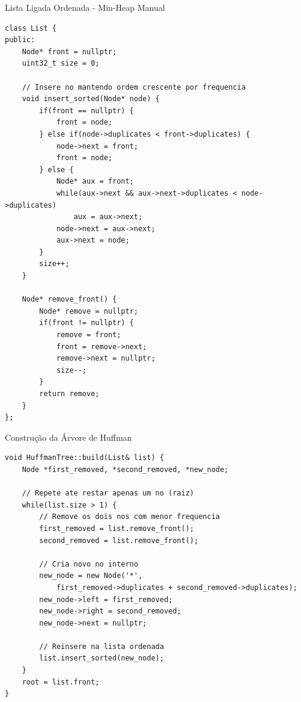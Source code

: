 \documentclass{beamer}
\begin{document}
\begin{frame}[fragile]{Lista Ligada Ordenada - Min-Heap Manual}
    \begin{lstlisting}[style=CStyle, caption=Implementação de lista ordenada para construção da árvore]
class List {
public:
    Node* front = nullptr;
    uint32_t size = 0;
    
    // Insere no mantendo ordem crescente por frequencia
    void insert_sorted(Node* node) {
        if(front == nullptr) {
            front = node;
        } else if(node->duplicates < front->duplicates) {
            node->next = front;
            front = node;
        } else {
            Node* aux = front;
            while(aux->next && aux->next->duplicates < node->duplicates)
                aux = aux->next;
            node->next = aux->next;
            aux->next = node;
        }
        size++;
    }
    
    Node* remove_front() {
        Node* remove = nullptr;
        if(front != nullptr) {
            remove = front;
            front = remove->next;
            remove->next = nullptr;
            size--;
        }
        return remove;
    }
};
    \end{lstlisting}
\end{frame}

\begin{frame}[fragile]{Construção da Árvore de Huffman}
    \begin{lstlisting}[style=CStyle, caption=Algoritmo de construção da árvore]
void HuffmanTree::build(List& list) {
    Node *first_removed, *second_removed, *new_node;
    
    // Repete ate restar apenas um no (raiz)
    while(list.size > 1) {
        // Remove os dois nos com menor frequencia
        first_removed = list.remove_front();
        second_removed = list.remove_front();
        
        // Cria novo no interno
        new_node = new Node('*', 
            first_removed->duplicates + second_removed->duplicates);
        new_node->left = first_removed;
        new_node->right = second_removed;
        new_node->next = nullptr;
        
        // Reinsere na lista ordenada
        list.insert_sorted(new_node);
    }
    root = list.front;
}
    \end{lstlisting}
\end{frame}
\end{document}
